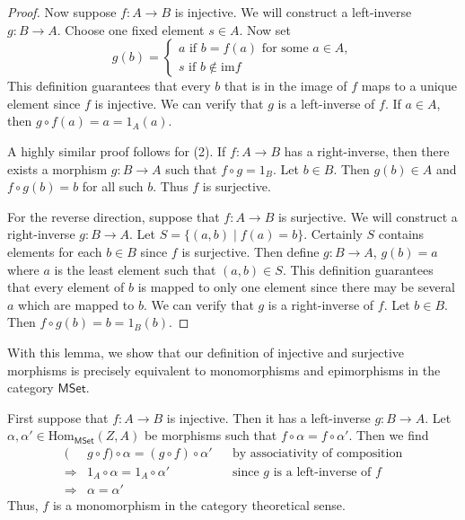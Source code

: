 \documentclass[../../master.tex]{subfiles}
\begin{document}
\begin{solution}
\begin{proof}
        Now suppose \(f: A \to B\) is injective. We will construct a left-inverse \(g: B \to A\).
        Choose one fixed element \(s \in A\).
        Now set
        \begin{equation*}
          g(b) =
          \begin{cases}
            a \text{ if } b = f(a) \text{ for some } a \in A, \\
            s \text{ if } b \notin \text{im} f
          \end{cases}
        \end{equation*}
        This definition guarantees that every \(b\) that is in the image of \(f\) maps to a unique element since \(f\) is injective.
        We can verify that \(g\) is a left-inverse of \(f\).
        If \(a \in A\), then \(g \circ f(a) = a = 1_{A}(a)\).

        A highly similar proof follows for (2). If \(f: A \to B\) has a right-inverse, then there exists a morphism \(g: B \to A\) such that \(f \circ g = 1_{B}\).
        Let \(b \in B\). Then \(g(b) \in A\) and \(f \circ g(b) = b\) for all such \(b\).
        Thus \(f\) is surjective.

        For the reverse direction, suppose that \(f: A \to B\) is surjective. We will construct a right-inverse \(g: B \to A\).
        Let \(S = \{(a, b) \mid f(a) = b\}\).
        Certainly \(S\) contains elements for each \(b \in B\) since \(f\) is surjective.
        Then define \(g: B \to A\), \(g(b) = a\) where \(a\) is the least element such that \((a, b) \in S\).
        This definition guarantees that every element of \(b\) is mapped to only one element since there may be several \(a\) which are mapped to \(b\).
        We can verify that \(g\) is a right-inverse of \(f\).
        Let \(b \in B\). Then \(f \circ g(b) = b = 1_{B}(b)\).
      \end{proof}
      With this lemma, we show that our definition of injective and surjective morphisms is precisely equivalent to monomorphisms and epimorphisms in the category \(\mathsf{MSet}\).

      First suppose that \(f: A \to B\) is injective. Then it has a left-inverse \(g: B \to A\).
      Let \(\alpha, \alpha' \in \text{Hom}_{\mathsf{MSet}}(Z, A)\) be morphisms such that \(f \circ \alpha = f \circ \alpha'\).
      Then we find
      \begin{align*}
        (&g \circ f) \circ \alpha = (g \circ f) \circ \alpha' && \text{by associativity of composition} \\
        \Longrightarrow & 1_{A} \circ \alpha = 1_{A} \circ \alpha' && \text{since \(g\) is a left-inverse of \(f\)} \\
        \Longrightarrow & \alpha = \alpha'
      \end{align*}
      Thus, \(f\) is a monomorphism in the category theoretical sense.


\end{solution}
\end{document}
